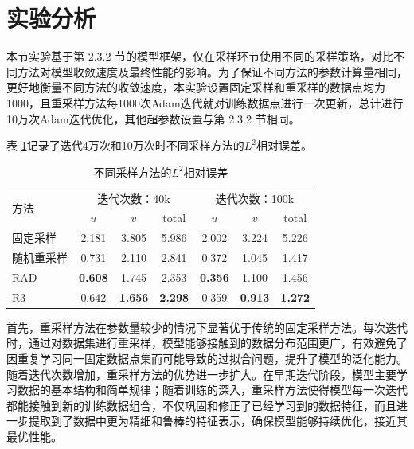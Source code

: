 \section{实验分析}

本节实验基于第 2.3.2 节的模型框架，仅在采样环节使用不同的采样策略，对比不同方法对模型收敛速度及最终性能的影响。为了保证不同方法的参数计算量相同，更好地衡量不同方法的收敛速度，本实验设置固定采样和重采样的数据点均为1000，且重采样方法每1000次Adam迭代就对训练数据点进行一次更新，总计进行10万次Adam迭代优化，其他超参数设置与第 2.3.2 节相同。

表 \ref{tab:sampler_tab}记录了迭代4万次和10万次时不同采样方法的$L^2$相对误差。

\begin{table}[htbp]
    \centering
    \caption{不同采样方法的$L^2$相对误差}
    \label{tab:sampler_tab}
    \begin{tabular}{@{}lcccccc@{}}
        \toprule
        \multirow{2}{*}{方法} & \multicolumn{3}{c}{迭代次数：40k} & \multicolumn{3}{c}{迭代次数：100k} \\
                 & $u$     & $v$     & total   & $u$     & $v$     & total   \\
        \midrule
        固定采样  & 2.181   & 3.805   & 5.986   & 2.002   & 3.224   & 5.226   \\
        随机重采样  & 0.731   & 2.110   & 2.841   & 0.372   & 1.045   & 1.417   \\
        RAD  & \textbf{0.608}   & 1.745   & 2.353   & \textbf{0.356}   & 1.100   & 1.456   \\
        R3  & 0.642  & \textbf{1.656}  & \textbf{2.298}  & 0.359  & \textbf{0.913}  & \textbf{1.272}\\ 
        \bottomrule
    \end{tabular}
\end{table}

首先，重采样方法在参数量较少的情况下显著优于传统的固定采样方法。每次迭代时，通过对数据集进行重采样，模型能够接触到的数据分布范围更广，有效避免了因重复学习同一固定数据点集而可能导致的过拟合问题，提升了模型的泛化能力。随着迭代次数增加，重采样方法的优势进一步扩大。在早期迭代阶段，模型主要学习数据的基本结构和简单规律；随着训练的深入，重采样方法使得模型每一次迭代都能接触到新的训练数据组合，不仅巩固和修正了已经学习到的数据特征，而且进一步提取到了数据中更为精细和鲁棒的特征表示，确保模型能够持续优化，接近其最优性能。

